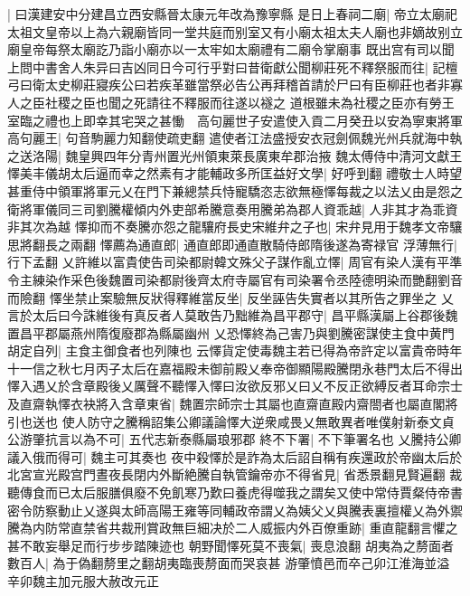 |{
	曰漢建安中分建昌立西安縣晉太康元年改為豫寧縣}
是日上春祠二廟|{
	帝立太廟祀太祖文皇帝以上為六親廟皆同一堂共庭而别室又有小廟太祖太夫人廟也非嫡故别立廟皇帝每祭太廟訖乃詣小廟亦以一太牢如太廟禮有二廟令掌廟事}
既出宫有司以聞上問中書舍人朱异曰吉凶同日今可行乎對曰昔衛獻公聞柳莊死不釋祭服而往|{
	記檀弓曰衛太史柳莊寢疾公曰若疾革雖當祭必告公再拜稽首請於尸曰有臣柳莊也者非寡人之臣社稷之臣也聞之死請往不釋服而往遂以襚之}
道根雖未為社稷之臣亦有勞王室臨之禮也上即幸其宅哭之甚慟　高句麗世子安遣使入貢二月癸丑以安為寧東將軍高句麗王|{
	句音駒麗力知翻使疏吏翻}
遣使者江法盛授安衣冠劍佩魏光州兵就海中執之送洛陽|{
	魏皇興四年分青州置光州領東萊長廣東牟郡治掖}
魏太傅侍中清河文獻王懌美丰儀胡太后逼而幸之然素有才能輔政多所匡益好文學|{
	好呼到翻}
禮敬士人時望甚重侍中領軍將軍元乂在門下兼總禁兵恃寵驕恣志欲無極懌每裁之以法乂由是怨之衛將軍儀同三司劉騰權傾内外吏部希騰意奏用騰弟為郡人資乖越|{
	人非其才為乖資非其次為越}
懌抑而不奏騰亦怨之龍驤府長史宋維弁之子也|{
	宋弁見用于魏孝文帝驤思將翻長之兩翻}
懌薦為通直郎|{
	通直郎即通直散騎侍郎隋後遂為寄禄官}
浮薄無行|{
	行下孟翻}
乂許維以富貴使告司染都尉韓文殊父子謀作亂立懌|{
	周官有染人漢有平準令主練染作采色後魏置司染都尉後齊太府寺屬官有司染署令丞陸德明染而艷翻劉音而險翻}
懌坐禁止案驗無反狀得釋維當反坐|{
	反坐誣告失實者以其所告之罪坐之}
乂言於太后曰今誅維後有真反者人莫敢告乃黜維為昌平郡守|{
	昌平縣漢屬上谷郡後魏置昌平郡屬燕州隋復廢郡為縣屬幽州}
乂恐懌終為己害乃與劉騰密謀使主食中黄門胡定自列|{
	主食主御食者也列陳也}
云懌貨定使毒魏主若已得為帝許定以富貴帝時年十一信之秋七月丙子太后在嘉福殿未御前殿乂奉帝御顯陽殿騰閉永巷門太后不得出懌入遇乂於含章殿後乂厲聲不聽懌入懌曰汝欲反邪乂曰乂不反正欲縛反者耳命宗士及直齋執懌衣袂將入含章東省|{
	魏置宗師宗士其屬也直齋直殿内齋閤者也屬直閣將引也送也}
使人防守之騰稱詔集公卿議論懌大逆衆咸畏乂無敢異者唯僕射新泰文貞公游肇抗言以為不可|{
	五代志新泰縣屬琅邪郡}
終不下署|{
	不下筆署名也}
乂騰持公卿議入俄而得可|{
	魏主可其奏也}
夜中殺懌於是詐為太后詔自稱有疾還政於帝幽太后於北宮宣光殿宫門晝夜長閉内外斷絶騰自執管鑰帝亦不得省見|{
	省悉景翻見賢遍翻}
裁聽傳食而已太后服膳俱廢不免飢寒乃歎曰養虎得噬我之謂矣又使中常侍賈粲侍帝書密令防察動止乂遂與太師高陽王雍等同輔政帝謂乂為姨父乂與騰表裏擅權乂為外禦騰為内防常直禁省共裁刑賞政無巨細决於二人威振内外百僚重跡|{
	重直龍翻言懼之甚不敢妄舉足而行步步踏陳迹也}
朝野聞懌死莫不喪氣|{
	喪息浪翻}
胡夷為之剺面者數百人|{
	為于偽翻剺里之翻胡夷臨喪剺面而哭哀甚}
游肇憤邑而卒己卯江淮海並溢　辛卯魏主加元服大赦改元正


